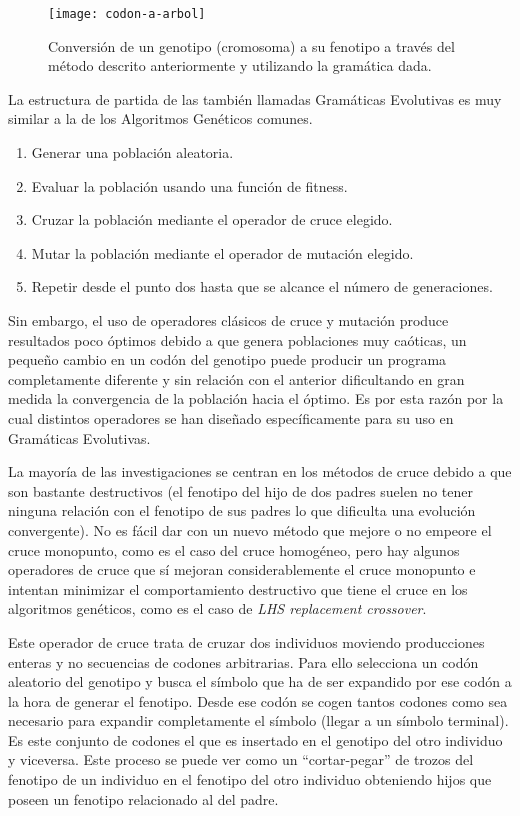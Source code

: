 \begin{figure}[H]
\centering
\texttt{[image: codon-a-arbol]}
\caption{Conversión de un genotipo (cromosoma) a su fenotipo a través del método descrito anteriormente y utilizando la gramática dada\cite{colmenarApuntes}.}
\end{figure}

La estructura de partida de las también llamadas Gramáticas Evolutivas es muy similar a la de los Algoritmos Genéticos comunes.
\begin{enumerate}
\item Generar una población aleatoria.
\item Evaluar la población usando una función de fitness.
\item Cruzar la población mediante el operador de cruce elegido.
\item Mutar la población mediante el operador de mutación elegido.
\item Repetir desde el punto dos hasta que se alcance el número de generaciones.
\end{enumerate}

Sin embargo, el uso de operadores clásicos de cruce y mutación produce resultados poco óptimos debido a que genera poblaciones muy caóticas, un pequeño cambio en un codón del genotipo puede producir un programa completamente diferente y sin relación con el anterior dificultando en gran medida la convergencia de la población hacia el óptimo. Es por esta razón por la cual distintos operadores se han diseñado específicamente para su uso en Gramáticas Evolutivas.

La mayoría de las investigaciones se centran en los métodos de cruce debido a que son bastante destructivos (el fenotipo del hijo de dos padres suelen no tener ninguna relación con el fenotipo de sus padres lo que dificulta una evolución convergente). No es fácil dar con un nuevo método que mejore o no empeore el cruce monopunto, como es el caso del cruce homogéneo\cite{O'neill:2003:CGE:608284.608289}, pero hay algunos operadores de cruce que sí mejoran considerablemente el cruce monopunto e intentan minimizar el comportamiento destructivo que tiene el cruce en los algoritmos genéticos, como es el caso de \textit{LHS replacement crossover}\cite{harper2005structure}.

Este operador de cruce trata de cruzar dos individuos moviendo producciones enteras y no secuencias de codones arbitrarias. Para ello selecciona un codón aleatorio del genotipo y busca el símbolo que ha de ser expandido por ese codón a la hora de generar el fenotipo. Desde ese codón se cogen tantos codones como sea necesario para expandir completamente el símbolo (llegar a un símbolo terminal). Es este conjunto de codones el que es insertado en el genotipo del otro individuo y viceversa. Este proceso se puede ver como un ``cortar-pegar'' de trozos del fenotipo de un individuo en el fenotipo del otro individuo obteniendo hijos que poseen un fenotipo relacionado al del padre.

